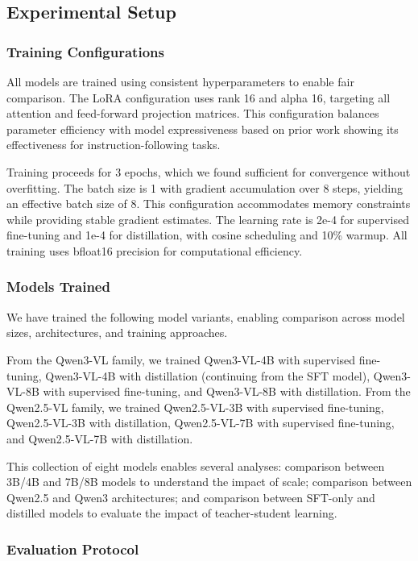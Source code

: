\documentclass[11pt,a4paper]{article}
\begin{document}
\subsection{Experimental Setup}

\subsubsection{Training Configurations}

All models are trained using consistent hyperparameters to enable fair comparison. The LoRA configuration uses rank 16 and alpha 16, targeting all attention and feed-forward projection matrices. This configuration balances parameter efficiency with model expressiveness based on prior work showing its effectiveness for instruction-following tasks.

Training proceeds for 3 epochs, which we found sufficient for convergence without overfitting. The batch size is 1 with gradient accumulation over 8 steps, yielding an effective batch size of 8. This configuration accommodates memory constraints while providing stable gradient estimates. The learning rate is 2e-4 for supervised fine-tuning and 1e-4 for distillation, with cosine scheduling and 10\% warmup. All training uses bfloat16 precision for computational efficiency.

\subsubsection{Models Trained}

We have trained the following model variants, enabling comparison across model sizes, architectures, and training approaches.

From the Qwen3-VL family, we trained Qwen3-VL-4B with supervised fine-tuning, Qwen3-VL-4B with distillation (continuing from the SFT model), Qwen3-VL-8B with supervised fine-tuning, and Qwen3-VL-8B with distillation. From the Qwen2.5-VL family, we trained Qwen2.5-VL-3B with supervised fine-tuning, Qwen2.5-VL-3B with distillation, Qwen2.5-VL-7B with supervised fine-tuning, and Qwen2.5-VL-7B with distillation.

This collection of eight models enables several analyses: comparison between 3B/4B and 7B/8B models to understand the impact of scale; comparison between Qwen2.5 and Qwen3 architectures; and comparison between SFT-only and distilled models to evaluate the impact of teacher-student learning.

\subsubsection{Evaluation Protocol}
\end{document}
